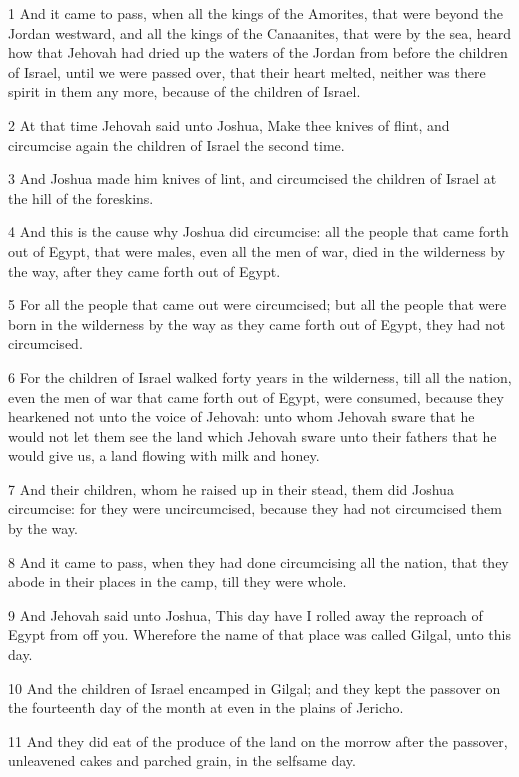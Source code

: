 \par 1 And it came to pass, when all the kings of the Amorites, that were beyond the Jordan westward, and all the kings of the Canaanites, that were by the sea, heard how that Jehovah had dried up the waters of the Jordan from before the children of Israel, until we were passed over, that their heart melted, neither was there spirit in them any more, because of the children of Israel.
\par 2 At that time Jehovah said unto Joshua, Make thee knives of flint, and circumcise again the children of Israel the second time.
\par 3 And Joshua made him knives of lint, and circumcised the children of Israel at the hill of the foreskins.
\par 4 And this is the cause why Joshua did circumcise: all the people that came forth out of Egypt, that were males, even all the men of war, died in the wilderness by the way, after they came forth out of Egypt.
\par 5 For all the people that came out were circumcised; but all the people that were born in the wilderness by the way as they came forth out of Egypt, they had not circumcised.
\par 6 For the children of Israel walked forty years in the wilderness, till all the nation, even the men of war that came forth out of Egypt, were consumed, because they hearkened not unto the voice of Jehovah: unto whom Jehovah sware that he would not let them see the land which Jehovah sware unto their fathers that he would give us, a land flowing with milk and honey.
\par 7 And their children, whom he raised up in their stead, them did Joshua circumcise: for they were uncircumcised, because they had not circumcised them by the way.
\par 8 And it came to pass, when they had done circumcising all the nation, that they abode in their places in the camp, till they were whole.
\par 9 And Jehovah said unto Joshua, This day have I rolled away the reproach of Egypt from off you. Wherefore the name of that place was called Gilgal, unto this day.
\par 10 And the children of Israel encamped in Gilgal; and they kept the passover on the fourteenth day of the month at even in the plains of Jericho.
\par 11 And they did eat of the produce of the land on the morrow after the passover, unleavened cakes and parched grain, in the selfsame day.

